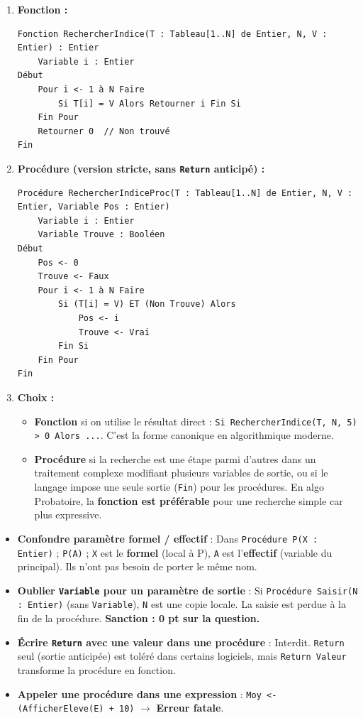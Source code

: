 \documentclass[11pt]{article}
\begin{document}
\begin{corrige}[Exercice 3]
\begin{enumerate}
    \item \textbf{Fonction :}
\begin{lstlisting}
Fonction RechercherIndice(T : Tableau[1..N] de Entier, N, V : Entier) : Entier
    Variable i : Entier
Début
    Pour i <- 1 à N Faire
        Si T[i] = V Alors Retourner i Fin Si
    Fin Pour
    Retourner 0  // Non trouvé
Fin
\end{lstlisting}
    \item \textbf{Procédure (version stricte, sans \texttt{Return} anticipé) :}
\begin{lstlisting}
Procédure RechercherIndiceProc(T : Tableau[1..N] de Entier, N, V : Entier, Variable Pos : Entier)
    Variable i : Entier
    Variable Trouve : Booléen
Début
    Pos <- 0
    Trouve <- Faux
    Pour i <- 1 à N Faire
        Si (T[i] = V) ET (Non Trouve) Alors
            Pos <- i
            Trouve <- Vrai
        Fin Si
    Fin Pour
Fin
\end{lstlisting}
    \item \textbf{Choix :} 
    \begin{itemize}
        \item \textbf{Fonction} si on utilise le résultat direct : \texttt{Si RechercherIndice(T, N, 5) > 0 Alors ...}. C'est la forme canonique en algorithmique moderne.
        \item \textbf{Procédure} si la recherche est une étape parmi d'autres dans un traitement complexe modifiant plusieurs variables de sortie, ou si le langage impose une seule sortie (\texttt{Fin}) pour les procédures. En algo Probatoire, la \textbf{fonction est préférable} pour une recherche simple car plus expressive.
    \end{itemize}
\end{enumerate}
\end{corrige}

\begin{attention}
\begin{itemize}
    \item \textbf{Confondre paramètre formel / effectif} : Dans \texttt{Procédure P(X : Entier)} ; \texttt{P(A)} ; \texttt{X} est le \textbf{formel} (local à P), \texttt{A} est l'\textbf{effectif} (variable du principal). Ils n'ont pas besoin de porter le même nom.
    \item \textbf{Oublier \texttt{Variable} pour un paramètre de sortie} : Si \texttt{Procédure Saisir(N : Entier)} (sans \texttt{Variable}), \texttt{N} est une copie locale. La saisie est perdue à la fin de la procédure. \textbf{Sanction : 0 pt sur la question.}
    \item \textbf{Écrire \texttt{Return} avec une valeur dans une procédure} : Interdit. \texttt{Return} seul (sortie anticipée) est toléré dans certains logiciels, mais \texttt{Return Valeur} transforme la procédure en fonction.
    \item \textbf{Appeler une procédure dans une expression} : \texttt{Moy <- (AfficherEleve(E) + 10)} $\rightarrow$ \textbf{Erreur fatale}.
\end{itemize}
\end{attention}
\end{document}
